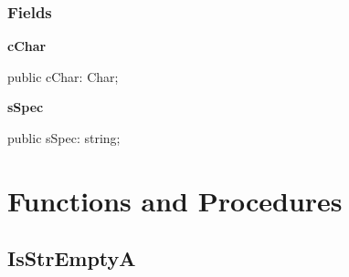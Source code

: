 \documentclass{report}
\newif\ifpdf
\begin{document}
\subsubsection*{\large{\textbf{Fields}}\normalsize\hspace{1ex}\hfill}
\begin{list}{}{
\setlength{\itemindent}{0cm}
\setlength{\listparindent}{0cm}
\setlength{\leftmargin}{\evensidemargin}
\addtolength{\leftmargin}{\tmplength}
\settowidth{\labelsep}{X}
\addtolength{\leftmargin}{\labelsep}
\setlength{\labelwidth}{\tmplength}
}
\label{PasDoc_Utils.TCharReplacement-cChar}
\item[\textbf{cChar}\hfill]
\ifpdf
\begin{flushleft}
\fi
\begin{ttfamily}
public cChar: Char;\end{ttfamily}

\ifpdf
\end{flushleft}
\fi


\par  \label{PasDoc_Utils.TCharReplacement-sSpec}
\item[\textbf{sSpec}\hfill]
\ifpdf
\begin{flushleft}
\fi
\begin{ttfamily}
public sSpec: string;\end{ttfamily}

\ifpdf
\end{flushleft}
\fi


\par  \end{list}
\section{Functions and Procedures}
\ifpdf
\subsection*{\large{\textbf{IsStrEmptyA}}\normalsize\hspace{1ex}\hrulefill}
\else
\end{document}
